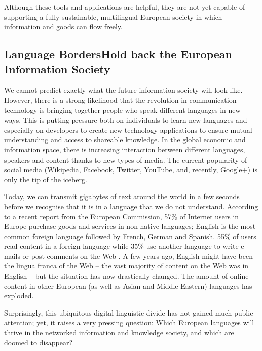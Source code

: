\begin{multicols}{2}
  Although these tools and applications are helpful, they are not yet capable of supporting a fully-sustainable, multilingual European society in which information and goods can flow freely.

  \subsection[Language Borders Hold back the European Information Society]{Language Borders\newline Hold back the European Information Society}

  We cannot predict exactly what the future information society will look like. However, there is a strong likelihood that the revolution in communication technology is bringing together people who speak different languages in new ways. This is putting pressure both on individuals to learn new languages and especially on developers to create new technology applications to ensure mutual understanding and access to shareable knowledge. In the global economic and information space, there is increasing interaction between different languages, speakers and content thanks to new types of media. The current popularity of social media (Wikipedia, Facebook, Twitter, YouTube, and, recently, Google+) is only the tip of the iceberg.


  Today, we can transmit gigabytes of text around the world in a few seconds before we recognise that it is in a language that we do not understand. According to a recent report from the European Commission, 57\% of Internet users in Europe purchase goods and services in non-native languages; English is the most common foreign language followed by French, German and Spanish. 55\% of users read content in a foreign language while 35\% use another language to write e-mails or post comments on the Web \cite{EC1}. A few years ago, English might have been the lingua franca of the Web -- the vast majority of content on the Web was in English -- but the situation has now drastically changed. The amount of online content in other European (as well as Asian and Middle Eastern) languages has exploded.

  Surprisingly, this ubiquitous digital linguistic divide has not gained much public attention; yet, it raises a very pressing question: Which European languages will thrive in the networked information and knowledge society, and which are doomed to disappear?


\end{multicols}
